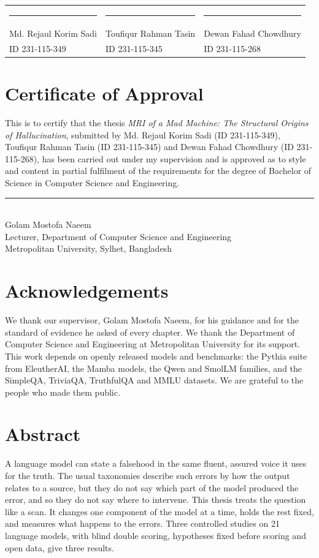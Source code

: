 \documentclass[11pt,a4paper,oneside]{report}
\begin{document}
\vspace{2.2cm}
\noindent
\begin{tabularx}{\linewidth}{XXX}
\rule{0.85\linewidth}{0.4pt} & \rule{0.85\linewidth}{0.4pt} & \rule{0.85\linewidth}{0.4pt}\\
Md. Rejaul Korim Sadi & Toufiqur Rahman Tasin & Dewan Fahad Chowdhury\\
{\small ID 231-115-349} & {\small ID 231-115-345} & {\small ID 231-115-268}\\
\end{tabularx}

\chapter*{Certificate of Approval}
This is to certify that the thesis \emph{MRI of a Mad Machine: The Structural Origins of Hallucination}, submitted by Md. Rejaul Korim Sadi (ID 231-115-349), Toufiqur Rahman Tasin (ID 231-115-345) and Dewan Fahad Chowdhury (ID 231-115-268), has been carried out under my supervision and is approved as to style and content in partial fulfilment of the requirements for the degree of Bachelor of Science in Computer Science and Engineering.

\vspace{2.6cm}
\noindent\rule{0.45\linewidth}{0.4pt}\\
Golam Mostofa Naeem\\
Lecturer, Department of Computer Science and Engineering\\
Metropolitan University, Sylhet, Bangladesh

\chapter*{Acknowledgements}
We thank our supervisor, Golam Mostofa Naeem, for his guidance and for the standard of evidence he asked of every chapter. We thank the Department of Computer Science and Engineering at Metropolitan University for its support. This work depends on openly released models and benchmarks: the Pythia suite from EleutherAI, the Mamba models, the Qwen and SmolLM families, and the SimpleQA, TriviaQA, TruthfulQA and MMLU datasets. We are grateful to the people who made them public.

\chapter*{Abstract}
A language model can state a falsehood in the same fluent, assured voice it uses for the truth. The usual taxonomies describe such errors by how the output relates to a source, but they do not say which part of the model produced the error, and so they do not say where to intervene. This thesis treats the question like a scan. It changes one component of the model at a time, holds the rest fixed, and measures what happens to the errors. Three controlled studies on 21 language models, with blind double scoring, hypotheses fixed before scoring and open data, give three results.
\end{document}
